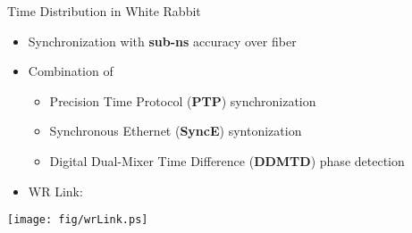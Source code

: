 \documentclass[compress,red]{beamer}
\begin{document}
\begin{frame}{Time Distribution in White Rabbit}

  \begin{itemize}
    \item Synchronization with {\bf sub-ns} accuracy over fiber
    \item Combination of
	\begin{itemize}
	  \item Precision Time Protocol ({\bf PTP}) synchronization
	  \item Synchronous Ethernet ({\bf SyncE}) syntonization
	  \item Digital Dual-Mixer Time Difference ({\bf DDMTD}) phase detection
	\end{itemize}
    \item WR Link:
  \end{itemize}

  \begin{center}
  \texttt{[image: fig/wrLink.ps]}
  \end{center}

\end{frame}
\end{document}
